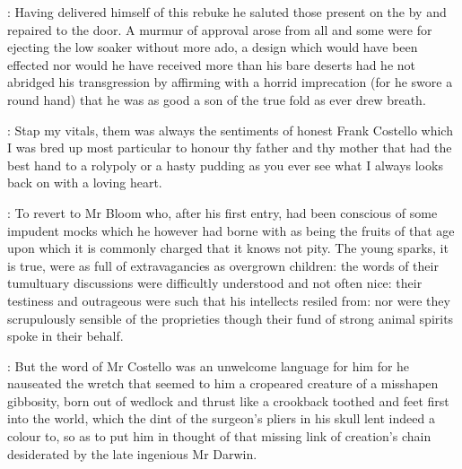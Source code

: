 \documentclass[12pt]{article}
\begin{document}
: Having delivered himself of this rebuke he saluted those present
on the by and repaired to the door. A murmur of approval arose from all
and some were for ejecting the low soaker without more ado, a design
which would have been effected nor would he have received more than his
bare deserts had he not abridged his transgression by affirming with a
horrid imprecation (for he swore a round hand) that he was as good a son
of the true fold as ever drew breath.

\PC: Stap my vitals, them was always the sentiments of honest Frank
Costello which I was bred up most particular to honour thy father and thy
mother that had the best hand to a rolypoly or a hasty pudding as you ever
see what I always looks back on with a loving heart.



: To revert to Mr Bloom who, after his first entry, had been conscious
of some impudent mocks which he however had borne with as being the fruits
of that age upon which it is commonly charged that it knows not pity. The
young sparks, it is true, were as full of extravagancies as overgrown
children: the words of their tumultuary discussions were difficultly
understood and not often nice: their testiness and outrageous
 were such that his intellects resiled from: nor were they
scrupulously sensible of the proprieties though their fund of strong
animal spirits spoke in their behalf.

: But the word of Mr Costello was an unwelcome language for him for he
nauseated the wretch that seemed to him a cropeared creature of a
misshapen gibbosity, born out of wedlock and thrust like a crookback
toothed and feet first into the world, which the dint of the surgeon's
pliers in his skull lent indeed a colour to, so as to put him in thought
of that missing link of creation's chain desiderated by the late ingenious
Mr Darwin.
\end{document}
